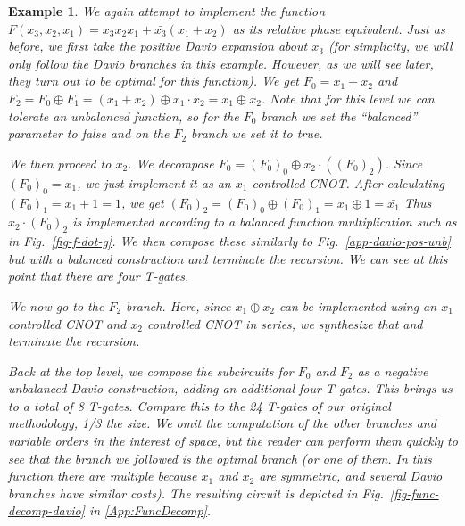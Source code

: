 \documentclass[paper]{ieice}
\newtheorem{example}{Example}
\begin{document}
\begin{example}
  \label{ex-davio}
    We again attempt to implement the function $F(x_3,x_2,x_1) = x_3x_2x_1 + \bar{x_3}(x_1 + x_2)$ as its relative phase equivalent.
    Just as before, we first take the positive Davio expansion about $x_3$ (for simplicity, we will only follow the Davio branches
  in this example. However, as  we will see later, they turn out to be optimal for this function). We get $F_0 = x_1 + x_2$ and
  $F_2 = F_0 \oplus F_1 = (x_1 + x_2) \oplus x_1 \cdot x_2 = x_1 \oplus x_2$. Note that for this level we can tolerate an unbalanced
  function, so for the $F_0$ branch we set the ``balanced'' parameter to false and on the $F_2$ branch we set it to true.

  We then proceed to $x_2$. We decompose $F_0 = (F_0)_0 \oplus x_2 \cdot ((F_0)_2)$. Since $(F_0)_0 = x_1$, we just implement it as an $x_1$
  controlled CNOT. After calculating $(F_0)_1 = x_1 + 1 = 1$, we get $(F_0)_2 = (F_0)_0 \oplus (F_0)_1 = x_1 \oplus 1 = \bar{x_1}$
  Thus $x_2 \cdot (F_0)_2$ is implemented according to a balanced function multiplication such as in Fig.~\ref{fig-f-dot-g}. We then compose
  these similarly to Fig.~\ref{app-davio-pos-unb} but with a balanced construction and terminate the recursion. We can see at this point that
  there are four T-gates.

  We now go to the $F_2$ branch. Here, since $x_1 \oplus x_2$ can be implemented using an $x_1$ controlled CNOT and $x_2$ controlled CNOT
  in series, we synthesize that and terminate the recursion.

  Back at the top level, we compose the subcircuits for $F_0$ and $F_2$ as a negative unbalanced Davio construction, adding an additional four
  T-gates. This brings us to a total of 8 T-gates. Compare this to the 24 T-gates of our original methodology, 1/3 the size. We omit
  the computation of the other branches and variable orders in the interest of space, but the reader can perform them  quickly to
  see that the branch we followed is the optimal branch (or one of them. In this function there are multiple because $x_1$  and
  $x_2$ are symmetric, and several Davio branches have similar costs). 
  The resulting circuit is depicted in Fig.~\ref{fig-func-decomp-davio} in \ref{App:FuncDecomp}.

\end{example}
\end{document}
